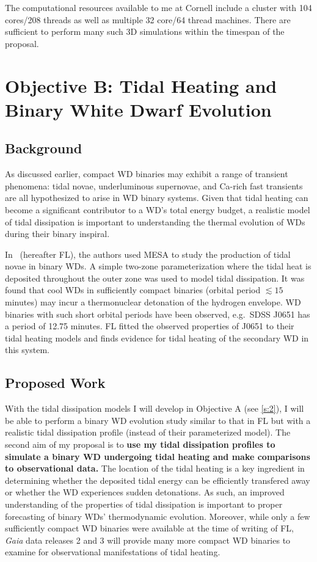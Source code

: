 \documentclass[12pt,
        usenames, %
        dvipsnames %
    ]{article}
\begin{document}
The computational resources available to me at Cornell include a cluster with
104 cores/208 threads as well as multiple 32 core/64 thread machines. There are
sufficient to perform many such 3D simulations within the timespan of the
proposal.

\section{Objective B\@: Tidal Heating and Binary White Dwarf Evolution
}\label{s:3}

\subsection{Background}

As discussed earlier, compact WD binaries may exhibit a range of transient
phenomena: tidal novae\cite{tidal_novae}, underluminous
supernovae\cite{underlum}, and Ca-rich fast transients\cite{carich} are all
hypothesized to arise in WD binary systems. Given that tidal heating can become
a significant contributor to a WD's total energy budget, a realistic model of
tidal dissipation is important to understanding the thermal evolution of WDs
during their binary inspiral.

In~\cite{tidal_novae} (hereafter FL), the authors used MESA\cite{MESA} to study
the production of tidal novae in binary WDs. A simple two-zone parameterization
where the tidal heat is deposited throughout the outer zone was used to model
tidal dissipation. It was found that cool WDs in sufficiently compact binaries
(orbital period $\lesssim 15$ minutes) may incur a thermonuclear detonation of
the hydrogen envelope. WD binaries with such short orbital periods have been
observed, e.g.\ SDSS J0651 has a period of 12.75 minutes\cite{12min}. FL fitted
the observed properties of J0651 to their tidal heating models and finds
evidence for tidal heating of the secondary WD in this system.

\subsection{Proposed Work}

With the tidal dissipation models I will develop in Objective A (see
\autoref{s:2}), I will be able to perform a binary WD evolution study similar to
that in FL but with a realistic tidal dissipation profile (instead of their
parameterized model). The second aim of my proposal is to \textbf{use my tidal
dissipation profiles to simulate a binary WD undergoing tidal heating and make
comparisons to observational data.} The location of the tidal heating is a key
ingredient in determining whether the deposited tidal energy can be efficiently
transfered away or whether the WD experiences sudden detonations. As such, an
improved understanding of the properties of tidal dissipation is important to
proper forecasting of binary WDs' thermodynamic evolution. Moreover, while only
a few sufficiently compact WD binaries were available at the time of writing of
FL, \emph{Gaia} data releases 2 and 3 will provide many more compact WD binaries
to examine for observational manifestations of tidal heating.
\end{document}
